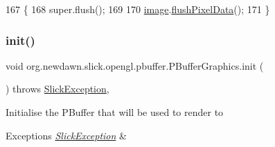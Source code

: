 \begin{DoxyCode}
167                         \{
168         super.flush();
169         
170         \mbox{\hyperlink{classorg_1_1newdawn_1_1slick_1_1opengl_1_1pbuffer_1_1_p_buffer_graphics_add068041cc793fa55a4019603b988d72}{image}}.\mbox{\hyperlink{classorg_1_1newdawn_1_1slick_1_1_image_ae8ba5dcbbaef48c9ee618f8c68aa1b12}{flushPixelData}}();
171     \}
\end{DoxyCode}
\mbox{\label{classorg_1_1newdawn_1_1slick_1_1opengl_1_1pbuffer_1_1_p_buffer_graphics_ae65c7b96c583158f68e1de6636f961ba}} 
\subsubsection{\texorpdfstring{init()}{init()}}
{\footnotesize\ttfamily void org.\+newdawn.\+slick.\+opengl.\+pbuffer.\+P\+Buffer\+Graphics.\+init (\begin{DoxyParamCaption}{ }\end{DoxyParamCaption}) throws \mbox{\hyperlink{classorg_1_1newdawn_1_1slick_1_1_slick_exception}{Slick\+Exception}}\hspace{0.3cm}{\ttfamily [inline]}, {\ttfamily [private]}}

Initialise the P\+Buffer that will be used to render to


\begin{DoxyExceptions}{Exceptions}
{\em \mbox{\hyperlink{classorg_1_1newdawn_1_1slick_1_1_slick_exception}{Slick\+Exception}}} & \\
\hline
\end{DoxyExceptions}

